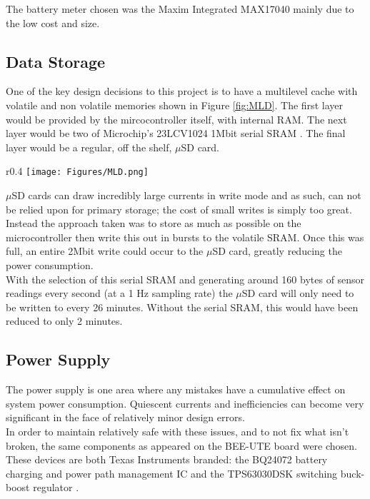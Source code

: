 \documentclass[12pt,openany,a4paper]{book}
\begin{document}
			The battery meter chosen was the Maxim Integrated MAX17040 \cite{max17} mainly due to the low cost and size. %
			
		\newpage
		\subsection{Data Storage}
		One of the key design decisions to this project is to have a multilevel cache with volatile and non volatile memories shown in Figure \ref{fig:MLD}. The first layer would be provided by the mircocontroller itself, with internal RAM. The next layer would be two of Microchip's 23LCV1024 1Mbit serial SRAM \cite{MICRAM}. The final layer would be a regular, off the shelf, $\mu$SD card. \\
				
				\begin{wrapfigure}{r}{0.4\textwidth}
					\centering
					\texttt{[image: Figures/MLD.png]}
					\caption{Memory Architecture}
					\label{fig:MLD}
				\end{wrapfigure}
		
		$\mu$SD cards can draw incredibly large currents in write mode \cite{Sandisk} and as such, can not be relied upon for primary storage; the cost of small writes is simply too great. Instead the approach taken was to store as much as possible on the microcontroller then write this out in bursts to the volatile SRAM. Once this was full, an entire 2Mbit write could occur to the $\mu$SD card, greatly reducing the power consumption. \\
		
		With the selection of this serial SRAM and generating around 160 bytes of sensor readings every second (at a 1 Hz sampling rate) the $\mu$SD card will only need to be written to every 26 minutes. Without the serial SRAM, this would have been reduced to only 2 minutes. \\
		
		\subsection{Power Supply}
		The power supply is one area where any mistakes have a cumulative effect on system power consumption. Quiescent currents and inefficiencies can become very significant in the face of relatively minor design errors. \\
		
		In order to maintain relatively safe with these issues, and to not fix what isn't broken, the same components as appeared on the BEE-UTE board were chosen. These devices are both Texas Instruments branded: the BQ24072 battery charging and power path management IC \cite{TIUSB} and the TPS63030DSK switching buck-boost regulator \cite{TIBUCK}. \\
		
\end{document}
